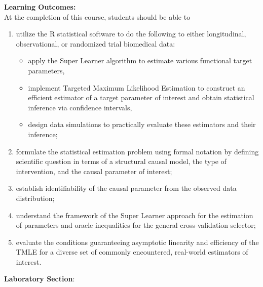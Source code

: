 \documentclass[11pt]{article}
\begin{document}
\textbf {\large Learning Outcomes:} \\
At the completion of this course, students should be able to
\begin{enumerate} \itemsep-0.4em
  \item utilize the R statistical software to do the following to either
    longitudinal, observational, or randomized trial biomedical data:
    \begin{itemize}
      \item apply the Super Learner algorithm to estimate various functional
        target parameters,
      \item implement Targeted Maximum Likelihood Estimation to construct an
        efficient estimator of a target parameter of interest and obtain
        statistical inference via confidence intervals,
      \item design data simulations to practically evaluate these estimators and
        their inference;
    \end{itemize}
  \item formulate the statistical estimation problem using formal notation by
    defining scientific question in terms of a structural causal model, the type
    of intervention, and the causal parameter of interest;
  \item establish identifiability of the causal parameter from the observed data
    distribution;
  \item understand the framework of the Super Learner approach for the
    estimation of parameters and oracle inequalities for the general
    cross-validation selector;
  \item evaluate the conditions guaranteeing asymptotic linearity and efficiency
    of the TMLE for a diverse set of commonly encountered, real-world estimators
    of interest. \\
\end{enumerate}

\newpage

\textbf{Laboratory Section}:
\end{document}

